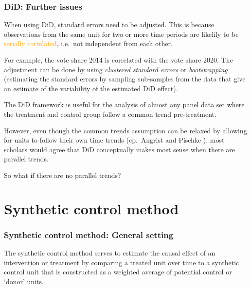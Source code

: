 \documentclass[12pt,english,dvipsnames,aspectratio=169,handout]{beamer}\usepackage[]{graphicx}\usepackage[]{xcolor}
\begin{document}
\begin{frame}
  \frametitle{DiD: Further issues}
\footnotesize

When using DiD, standard errors need to be adjusted. This is because observations from the same unit for two or more time periods are likelily to be \textcolor{orange}{serially correlated}, i.e.\ not independent from each other. 

For example, the vote share 2014 is correlated with the vote share 2020. The adjustment can be done by using \emph{clustered standard errors} or \emph{bootstrapping} (estimating the standard errors by sampling sub-samples from the data that give an estimate of the variability of the estimated DiD effect).

The DiD framework is useful for the analysis of almost any panel data set where the treatment and control group follow a common trend pre-treatment.

However, even though the common trends assumption can be relaxed by allowing for units to follow their own time trends (cp.\ Angrist and Pischke \citeyear{angrist_mostly_2009}), most scholars would agree that DiD conceptually makes most sense when there are parallel trends. 

So what if there are no parallel trends?

\end{frame}



\section{Synthetic control method}

\begin{frame}
  \frametitle{Synthetic control method: General setting}
\footnotesize
The synthetic control method serves to estimate the causal effect of an intervention or treatment by comparing a treated unit over time to a synthetic control unit that is constructed as a weighted average of potential control or `donor' units.

\vspace{3cm}
\end{frame}
\end{document}
